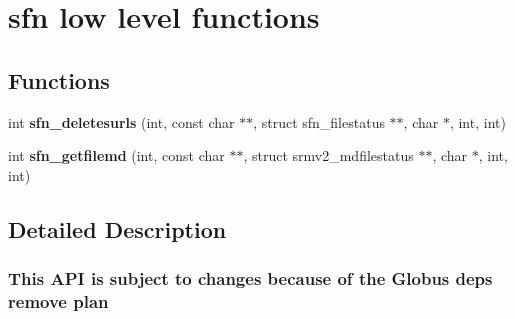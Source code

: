 \section{sfn low level functions}
\label{group__sfn__low__group}
\subsection*{Functions}
\begin{CompactItemize}
\item 
int \textbf{sfn\_\-deletesurls} (int, const char $\ast$$\ast$, struct sfn\_\-filestatus $\ast$$\ast$, char $\ast$, int, int)\label{group__sfn__low__group_g8f66412c50cf1257cf2f35a7e49aa78c}

\item 
int \textbf{sfn\_\-getfilemd} (int, const char $\ast$$\ast$, struct srmv2\_\-mdfilestatus $\ast$$\ast$, char $\ast$, int, int)\label{group__sfn__low__group_g6f09e0b4efd0277a3cada62545f92983}

\end{CompactItemize}


\subsection{Detailed Description}
\subsubsection*{This API is subject to changes because of the Globus deps remove plan }